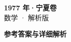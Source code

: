 \documentclass[zihao=-4, a4paper]{ctexart}
\begin{document}
\begin{center}
  {\Large\bfseries 1977 年·宁夏卷}\\[4pt]
  {\large 数学 · 解析版}
\end{center}
\medskip
{}

\clearpage
{}
\begin{center}{\Large\bfseries 参考答案与详细解析}\end{center}
\medskip

\end{document}
